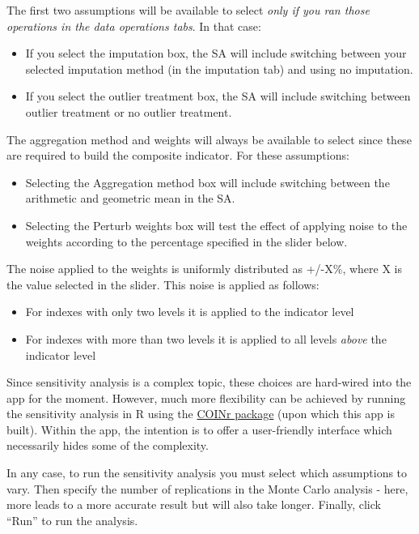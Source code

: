 \documentclass[
  letterpaper,
  DIV=11,
  numbers=noendperiod]{scrreprt}
\providecommand{\tightlist}{%
  \setlength{\itemsep}{0pt}\setlength{\parskip}{0pt}}\usepackage{longtable,booktabs,array}
\begin{document}
The first two assumptions will be available to select \emph{only if you
ran those operations in the data operations tabs}. In that case:

\begin{itemize}
\tightlist
\item
  If you select the imputation box, the SA will include switching
  between your selected imputation method (in the imputation tab) and
  using no imputation.
\item
  If you select the outlier treatment box, the SA will include switching
  between outlier treatment or no outlier treatment.
\end{itemize}

The aggregation method and weights will always be available to select
since these are required to build the composite indicator. For these
assumptions:

\begin{itemize}
\tightlist
\item
  Selecting the Aggregation method box will include switching between
  the arithmetic and geometric mean in the SA.
\item
  Selecting the Perturb weights box will test the effect of applying
  noise to the weights according to the percentage specified in the
  slider below.
\end{itemize}

The noise applied to the weights is uniformly distributed as +/-X\%,
where X is the value selected in the slider. This noise is applied as
follows:

\begin{itemize}
\tightlist
\item
  For indexes with only two levels it is applied to the indicator level
\item
  For indexes with more than two levels it is applied to all levels
  \emph{above} the indicator level
\end{itemize}

Since sensitivity analysis is a complex topic, these choices are
hard-wired into the app for the moment. However, much more flexibility
can be achieved by running the sensitivity analysis in R using the
\href{https://bluefoxr.github.io/COINr/articles/sensitivity.html}{COINr
package} (upon which this app is built). Within the app, the intention
is to offer a user-friendly interface which necessarily hides some of
the complexity.

In any case, to run the sensitivity analysis you must select which
assumptions to vary. Then specify the number of replications in the
Monte Carlo analysis - here, more leads to a more accurate result but
will also take longer. Finally, click ``Run'' to run the analysis.
\end{document}
